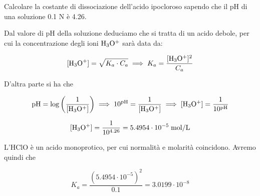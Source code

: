 \newpage

\begin{esercizio}
    Calcolare la costante di dissociazione dell'acido ipocloroso sapendo che il pH di una soluzione 0.1 N è 4.26.
\end{esercizio}
\begin{soluzione}
    Dal valore di pH della soluzione deduciamo che si tratta di un acido debole, per cui la concentrazione degli ioni $\rm H_3O^+$ sarà data da:

$$[\text{H}_3\text{O}^+]=\sqrt{K_a \cdot C_a}
\implies
K_a=\frac{[\rm H_3O^+]^2}{C_a}$$

D'altra parte si ha che

$$\rm pH=\log{\left( \frac{1}{[H_3O^+]} \right)}
\implies
10^{pH}=\frac{1}{[H_3O^+]}
\implies
[H_3O^+]=\frac{1}{10^{pH}}$$

$$\rm [H_3O^+]=\frac{1}{10^{4.26}}=5.4954 \cdot 10^{-5} \; \rm mol/L$$

L'HClO è un acido monoprotico, per cui normalità e molarità coincidono. Avremo quindi che

$$K_a=\frac{(5.4954 \cdot 10^{-5})^2}{0.1}
=3.0199 \cdot 10^{-8}$$
\end{soluzione}

\newpage


